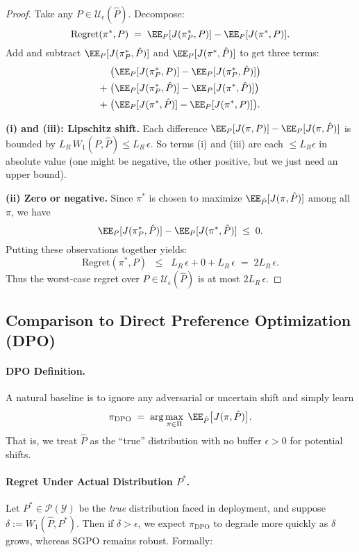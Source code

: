\begin{proof}
Take any $P\in \mathcal{U}_\epsilon(\hat{P})$.  Decompose:
\[
\text{Regret}(\pi^*,P)
\;=\;
\EE_{P}[J(\pi_{P}^*,P)] - \EE_{P}[J(\pi^*,P)].
\]
Add and subtract $\EE_{P}[J(\pi_{P}^*,\hat{P})]$ and $\EE_{P}[J(\pi^*,\hat{P})]$ to get three terms:
\begin{align*}
&\;\bigl(\EE_{P}[J(\pi_{P}^*,P)] - \EE_{P}[J(\pi_{P}^*,\hat{P})]\bigr)
\\
+&\;\bigl(\EE_{P}[J(\pi_{P}^*,\hat{P})] - \EE_{P}[J(\pi^*,\hat{P})]\bigr)
\\
+&\;\bigl(\EE_{P}[J(\pi^*,\hat{P})] - \EE_{P}[J(\pi^*,P)]\bigr).
\end{align*}

\noindent
\textbf{(i) and (iii): Lipschitz shift.}  
Each difference $\EE_{P}[J(\pi,P)] - \EE_{P}[J(\pi,\hat{P})]$ is bounded by $L_R\,W_1(P,\hat{P}) \le L_R\,\epsilon$.  So terms (i) and (iii) are each $\le L_R\epsilon$ in absolute value (one might be negative, the other positive, but we just need an upper bound).

\smallskip
\noindent
\textbf{(ii) Zero or negative.}
Since $\pi^*$ is chosen to maximize $\EE_{\hat{P}}[J(\pi,\hat{P})]$ among all $\pi$, we have
\[
\EE_{P}[J(\pi_{P}^*,\hat{P})]
-
\EE_{P}[J(\pi^*,\hat{P})]
\;\le\;
0.
\]
Putting these observations together yields:
\[
\text{Regret}(\pi^*,P)
\;\;\le\;\;
L_R\,\epsilon + 0 + L_R\,\epsilon
\;=\;
2L_R\,\epsilon.
\]
Thus the worst-case regret over $P\in \mathcal{U}_\epsilon(\hat{P})$ is at most $2L_R\,\epsilon$.
\end{proof}

\subsection{Comparison to Direct Preference Optimization (DPO)}
\label{sec:comparison}

\paragraph{DPO Definition.}
A natural baseline is to ignore any adversarial or uncertain shift and simply learn
\[
\pi_{\text{DPO}}
\;=\;
\arg\max_{\pi\in \Pi}
\;\EE_{\hat{P}}\bigl[J(\pi,\hat{P})\bigr].
\]
That is, we treat $\hat{P}$ as the “true” distribution with no buffer $\epsilon>0$ for potential shifts.

\paragraph{Regret Under Actual Distribution $P^*$.}
Let $P^*\in \mathcal{P}(\mathcal{Y})$ be the \emph{true} distribution faced in deployment, and suppose $\delta := W_1(\hat{P},P^*)$.  Then if $\delta>\epsilon$, we expect $\pi_{\text{DPO}}$ to degrade more quickly as $\delta$ grows, whereas SGPO remains robust.  Formally:

